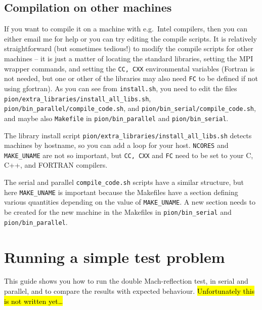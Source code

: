 \documentclass[a4paper,11pt]{report}
\begin{document}



\subsection{Compilation on other machines}
If you want to compile it on a machine with e.g.\ Intel compilers, then you can either email me for help or you can try editing the compile scripts.
It is relatively straightforward (but sometimes tedious!) to modify the compile scripts for other machines -- it is just a matter of locating the standard libraries, setting the MPI wrapper commands, and setting the \texttt{CC, CXX} environmental variables (Fortran is not needed, but one or other of the libraries may also need \texttt{FC} to be defined if not using gfortran).
As you can see from \lstinline|install.sh|, you need to edit the files
\lstinline|pion/extra_libraries/install_all_libs.sh|,
\lstinline|pion/bin_parallel/compile_code.sh|, and
\lstinline|pion/bin_serial/compile_code.sh|, and maybe also \lstinline|Makefile| in
\lstinline|pion/bin_parallel| and \lstinline|pion/bin_serial|.

The library install script \lstinline|pion/extra_libraries/install_all_libs.sh| detects machines by hostname, so you can add a loop for your host.
\texttt{NCORES} and \texttt{MAKE\_UNAME} are not so important, but \texttt{CC, CXX} and \texttt{FC} need to be set to your C, C++, and FORTRAN compilers.

The serial and parallel \lstinline|compile_code.sh| scripts have a similar structure, but here \texttt{MAKE\_UNAME} is important because the Makefiles have a section defining various quantities depending on the value of \texttt{MAKE\_UNAME}.
A new section needs to be created for the new machine in the Makefiles in \lstinline|pion/bin_serial| and \lstinline|pion/bin_parallel|.


\section{Running a simple test problem}
This guide shows you how to run the double Mach-reflection test, in serial and parallel, and to compare the results with expected behaviour.
\hl{Unfortunately this is not written yet\ldots}
\end{document}
